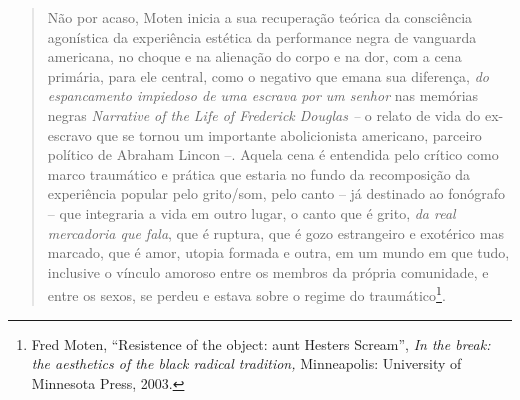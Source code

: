 \begin{quote}
Não por acaso, Moten inicia a sua recuperação teórica da consciência
agonística da experiência estética da performance negra de vanguarda
americana, no choque e na alienação do corpo e na dor, com a cena
primária, para ele central, como o negativo que emana sua diferença,
\emph{do espancamento impiedoso de uma escrava por um senhor} nas
memórias negras \emph{Narrative of the Life of Frederick Douglas --} o
relato de vida do ex-escravo que se tornou um importante abolicionista
americano, parceiro político de Abraham Lincon --. Aquela cena é
entendida pelo crítico como marco traumático e prática que estaria no
fundo da recomposição da experiência popular pelo grito/som, pelo canto
-- já destinado ao fonógrafo -- que integraria a vida em outro lugar, o
canto que é grito, \emph{da real mercadoria que fala}, que é ruptura,
que é gozo estrangeiro e exotérico mas marcado, que é amor, utopia
formada e outra, em um mundo em que tudo, inclusive o vínculo amoroso
entre os membros da própria comunidade, e entre os sexos, se perdeu e
estava sobre o regime do traumático\footnote{Fred Moten, ``Resistence of
  the object: aunt Hesters Scream'', \emph{In the break: the aesthetics
  of the black radical tradition,} Minneapolis: University of Minnesota
  Press, 2003.}.


\end{quote}
